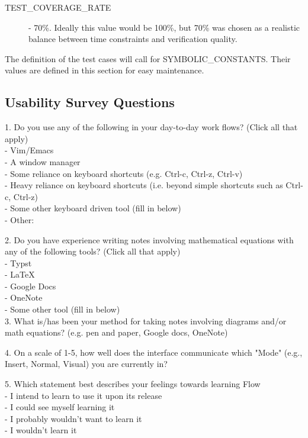 \documentclass[12pt, titlepage]{article}
\begin{document}
\begin{description}
  \item[TEST\_COVERAGE\_RATE] - 70\%. Ideally this value would be 100\%, but 70\% was chosen as a realistic balance between time constraints and verification quality.
\end{description}

The definition of the test cases will call for SYMBOLIC\_CONSTANTS.
Their values are defined in this section for easy maintenance.\\


\subsection{Usability Survey Questions}


1. Do you use any of the following in your day-to-day work flows? (Click all that apply) \\
- Vim/Emacs \\
- A window manager \\
- Some reliance on keyboard shortcuts (e.g. Ctrl-c, Ctrl-z, Ctrl-v) \\
- Heavy reliance on keyboard shortcuts (i.e. beyond simple shortcuts such as Ctrl-c, Ctrl-z) \\
- Some other keyboard driven tool (fill in below) \\
- Other: 

2. Do you have experience writing notes involving mathematical equations with any of the following tools? 
(Click all that apply) \\
- Typst \\
- LaTeX \\
- Google Docs \\
- OneNote \\
- Some other tool (fill in below) \\

3. What is/has been your method for taking notes involving diagrams and/or math equations? 
(e.g. pen and paper, Google docs, OneNote)

4. On a scale of 1-5, how well does the interface communicate which "Mode" (e.g., Insert, Normal, Visual) 
you are currently in?

5. Which statement best describes your feelings towards learning Flow \\
- I intend to learn to use it upon its release \\
- I could see myself learning it \\
- I probably wouldn't want to learn it \\
- I wouldn't learn it \\
\end{document}
